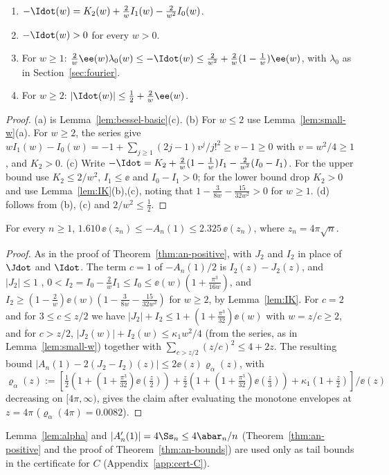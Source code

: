 \begin{lemma}\label{lem:Idot}
\begin{enumerate}[label=\textup{(\alph*)}]
\item $-\Idot(w)=K_2(w)+\frac2wI_1(w)-\frac2{w^2}I_0(w)$.
\item $-\Idot(w)>0$ for every $w>0$.
\item For $w\ge1$: $\frac2w\ee(w)\lambda_0(w)\le-\Idot(w)\le\frac2{w^2}+\frac2w(1-\frac1w)\ee(w)$, with $\lambda_0$ as in Section~\ref{sec:fourier}.
\item For $w\ge2$: $|\Idot(w)|\le\frac12+\frac2w\ee(w)$.
\end{enumerate}
\end{lemma}

\begin{proof}
(a) is Lemma~\ref{lem:bessel-basic}(c). (b) For $w\le2$ use Lemma~\ref{lem:small-w}(a). For $w\ge2$, the series give
$wI_1(w)-I_0(w)=-1+\sum_{j\ge1}(2j-1)v^j/j!^2\ge v-1\ge0$ with $v=w^2/4\ge1$, and $K_2>0$. (c) Write
$-\Idot=K_2+\frac2w(1-\frac1w)I_1-\frac2{w^2}(I_0-I_1)$. For the upper bound use $K_2\le2/w^2$, $I_1\le\ee$ and $I_0-I_1>0$; for the lower bound
drop $K_2>0$ and use Lemma~\ref{lem:IK}(b),(c), noting that $1-\frac3{8w}-\frac{15}{32w^2}>0$ for $w\ge1$. (d) follows from (b), (c) and
$2/w^2\le\frac12$.
\end{proof}

\begin{lemma}[The coefficients at $\nu=1$]\label{lem:alpha}
For every $n\ge1$, $1.610\,\ee(z_n)\le-A_n(1)\le2.325\,\ee(z_n)$, where $z_n=4\pi\sqrt n$.
\end{lemma}

\begin{proof}
As in the proof of Theorem~\ref{thm:an-positive}, with $J_2$ and $I_2$ in place of $\Jdot$ and $\Idot$. The term $c=1$ of $-A_n(1)/2$ is
$I_2(z)-J_2(z)$, and $|J_2|\le1$ \cite[10.14.1]{DLMF}, $0<I_2=I_0-\frac2wI_1\le I_0\le\ee(w)(1+\frac{\pi^3}{16w})$, and
$I_2\ge(1-\frac2w)\ee(w)(1-\frac3{8w}-\frac{15}{32w^2})$ for $w\ge2$, by Lemma~\ref{lem:IK}. For $c=2$ and for $3\le c\le z/2$ we have
$|J_2|+I_2\le1+(1+\frac{\pi^3}{32})\ee(w)$ with $w=z/c\ge2$, and for $c>z/2$, $|J_2(w)|+I_2(w)\le\kappa_1w^2/4$ (from the series, as in
Lemma~\ref{lem:small-w}) together with $\sum_{c>z/2}(z/c)^2\le4+2z$. The resulting bound $|A_n(1)-2(J_2-I_2)(z)|\le2\ee(z)\varrho_\alpha(z)$, with
$\varrho_\alpha(z):=[\frac12(1+(1+\frac{\pi^3}{32})\ee(\frac z2))+\frac z2(1+(1+\frac{\pi^3}{32})\ee(\frac z3))+\kappa_1(1+\frac z2)]/\ee(z)$ decreasing on
$[4\pi,\infty)$, gives the claim after evaluating the monotone envelopes at $z=4\pi$ ($\varrho_\alpha(4\pi)=0.0082$).
\end{proof}

Lemma~\ref{lem:alpha} and $|A_n'(1)|=4\Ss_n\le4\abar_n/n$ (Theorem~\ref{thm:an-positive} and the proof of Theorem~\ref{thm:an-bounds}) are used only as tail bounds in the certificate for
$C$ (Appendix~\ref{app:cert-C}).

